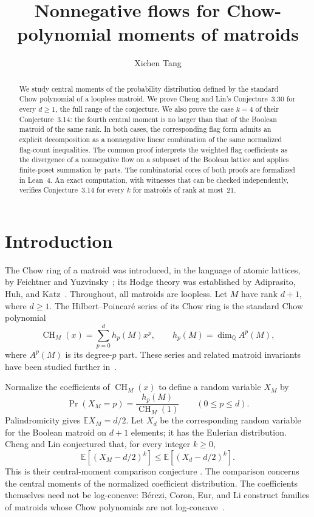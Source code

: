 \documentclass[11pt]{amsart}
\title[Nonnegative flows for Chow-polynomial moments]
  {Nonnegative flows for Chow-polynomial moments of matroids}
\author{Xichen Tang}
\date{}
\theoremstyle{definition}
\theoremstyle{remark}
\newcommand{\CH}{\operatorname{CH}}
\newcommand{\E}{\mathbb E}
\begin{document}
\begin{abstract}
We study central moments of the probability distribution defined by the
standard Chow polynomial of a loopless matroid.  We prove Cheng and Lin's
Conjecture~3.30 for every $d\ge1$, the full range of the conjecture.  We
also prove the case $k=4$ of their
Conjecture~3.14: the fourth central moment is no larger than that of the
Boolean matroid of the same rank.  In both cases, the corresponding flag form
admits an explicit decomposition as a nonnegative linear combination of the
same normalized flag-count inequalities.  The common proof interprets the
weighted flag coefficients as the divergence of a nonnegative flow on a
subposet of the Boolean lattice and applies finite-poset summation by parts.
The combinatorial cores of both proofs are formalized in Lean~4.  An exact
computation, with witnesses that can be checked independently, verifies
Conjecture~3.14 for every $k$ for matroids of rank at most~$21$.
\end{abstract}

\maketitle

\section{Introduction}

The Chow ring of a matroid was introduced, in the language of atomic
lattices, by Feichtner and Yuzvinsky~\cite{FY}; its Hodge theory was
established by Adiprasito, Huh, and Katz~\cite{AHK}.  Throughout, all
matroids are loopless.  Let $M$ have rank $d+1$, where $d\ge1$.  The
Hilbert--Poincar\'e series of its Chow ring is the standard Chow polynomial
\[
  \CH_M(x)=\sum_{p=0}^{d}h_p(M)x^p,
  \qquad h_p(M)=\dim_{\mathbb Q}A^p(M),
\]
where $A^p(M)$ is its degree-$p$ part.  These series and related matroid
invariants have been studied further in~\cite{FMSV}.

Normalize the coefficients of $\CH_M(x)$ to define a random variable $X_M$
by
\[
  \Pr(X_M=p)=\frac{h_p(M)}{\CH_M(1)}\qquad(0\le p\le d).
\]
Palindromicity gives $\E X_M=d/2$.  Let $X_d$ be the corresponding random
variable for the Boolean matroid on $d+1$ elements; it has the Eulerian
distribution. Cheng and Lin conjectured that, for every integer $k\ge0$,
\[
  \E\left[(X_M-d/2)^k\right]
  \le \E\left[(X_d-d/2)^k\right].
\]
This is their central-moment comparison conjecture
\cite[Conjecture~3.14]{ChengLin}.
The comparison concerns the central moments of the normalized coefficient
distribution.  The coefficients themselves need not be log-concave:
B\'erczi, Coron, Eur, and Li construct families of matroids whose Chow
polynomials are not log-concave~\cite{BCEL}.
\end{document}
